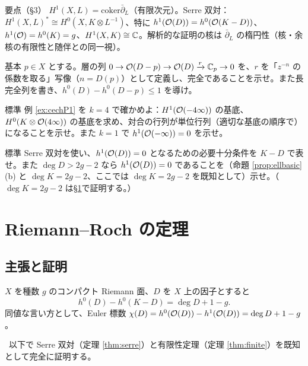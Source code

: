 \begin{keybox}{要点（§3）}
$H^1(X,L)=\mathrm{coker}\bar\partial_L$（有限次元）。Serre 双対：$H^1(X,L)^*\cong H^0(X,K\otimes L^{-1})$、特に $h^1(\mathcal O(D))=h^0(\mathcal O(K-D))$、$h^1(\mathcal O)=h^0(K)=g$、$H^1(X,K)\cong\mathbb C$。解析的な証明の核は $\bar\partial_L$ の楕円性（核・余核の有限性と随伴との同一視）。
\end{keybox}

\begin{prob}{基本}\label{p:ses}
$p\in X$ とする。層の列 $0\to\mathcal O(D-p)\to\mathcal O(D)\xrightarrow{r}\mathbb C_p\to0$ を、$r$ を「$z^{-n}$ の係数を取る」写像（$n=D(p)$）として定義し、完全であることを示せ。また長完全列を書き、$h^0(D)-h^0(D-p)\le1$ を導け。
\end{prob}
\begin{prob}{標準}\label{p:cechP1}
例 \ref{ex:cechP1} を $k=4$ で確かめよ：$H^1(\mathcal O(-4\infty))$ の基底、$H^0(K\otimes\mathcal O(4\infty))$ の基底を求め、対合の行列が単位行列（適切な基底の順序で）になることを示せ。また $k=1$ で $h^1(\mathcal O(-\infty))=0$ を示せ。
\end{prob}
\begin{prob}{標準}\label{p:Serredual}
Serre 双対を使い、$h^1(\mathcal O(D))=0$ となるための必要十分条件を $K-D$ で表せ。また $\deg D>2g-2$ なら $h^1(\mathcal O(D))=0$ であることを（命題 \ref{prop:ellbasic}(b) と $\deg K=2g-2$、ここでは $\deg K=2g-2$ を既知として）示せ。（$\deg K=2g-2$ は\S\ref{sec:rr}で証明する。）
\end{prob}

\section{Riemann--Roch の定理}\label{sec:rr}

\subsection{主張と証明}
\begin{thm}\label{thm:rr}
$X$ を種数 $g$ のコンパクト Riemann 面、$D$ を $X$ 上の因子とすると
\[
h^0(D)-h^0(K-D)=\deg D+1-g .
\]
同値な言い方として、Euler 標数 $\chi(D)=h^0(\mathcal O(D))-h^1(\mathcal O(D))=\deg D+1-g$。
\end{thm}
\tC\ \tP\quad 以下で Serre 双対（定理 \ref{thm:serre}）と有限性定理（定理 \ref{thm:finite}）を既知として完全に証明する。

